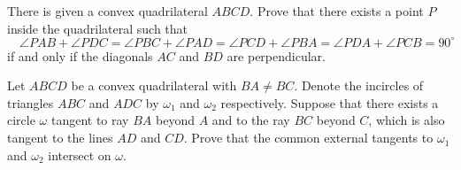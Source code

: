 \item[\textbf{G6.}]
There is given a convex quadrilateral 
$ ABCD$.
 Prove that there exists a point 
$ P$
 inside the quadrilateral such that
$\quad \angle PAB + \angle PDC = \angle PBC + \angle PAD = \angle PCD + \angle PBA = \angle PDA + \angle PCB = 90^{\circ}$
if and only if the diagonals 
$ AC$
 and 
$ BD$
 are perpendicular.

\item[\textbf{G7.}]
Let 
$ ABCD$
 be a convex quadrilateral with 
$ BA\neq BC$.
 Denote the incircles of triangles 
$ ABC$
 and 
$ ADC$
 by 
$ \omega_{1}$
 and 
$ \omega_{2}$
 respectively. Suppose that there exists a circle 
$ \omega$
 tangent to ray 
$ BA$
 beyond 
$ A$
 and to the ray 
$ BC$
 beyond 
$ C$, 
 which is also tangent to the lines 
$ AD$
 and 
$ CD$.
 Prove that the common external tangents to 
$ \omega_{1}$
 and 
$\omega_{2}$
 intersect on 
$ \omega$.